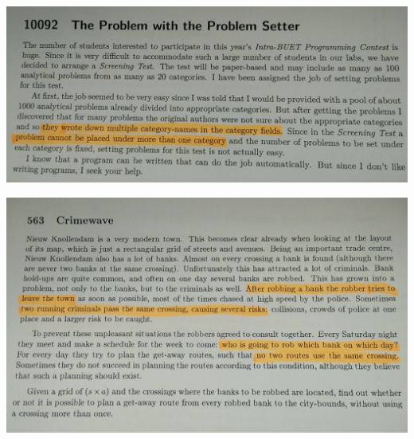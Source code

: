 \documentclass{beamer}
\begin{document}
\begin{frame}[fragile]

\begin{center}
\includegraphics[scale = 0.16]{example2.jpg}
\end{center}

\end{frame}

\begin{frame}[fragile]

\begin{center}
\includegraphics[scale = 0.16]{example3.jpg}
\end{center}

\end{frame}
\end{document}
